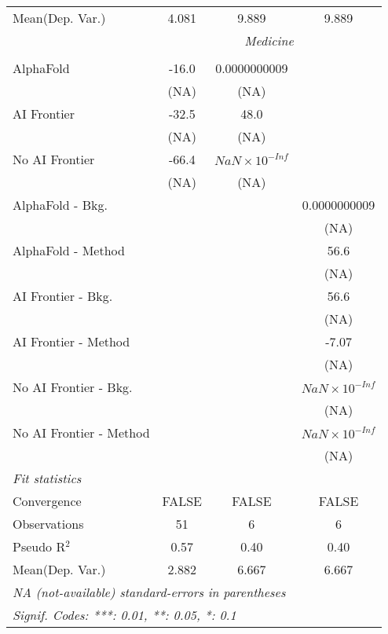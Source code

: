 \begin{tabular}{lccc}
Mean(Dep. Var.) & 4.081 & 9.889 & 9.889 \\
 & \multicolumn{3}{c}{\textit{Medicine}} \\ \\
   AlphaFold               & -16.0 & 0.0000000009           &   \\   
                           & (NA)  & (NA)                   &   \\   
   AI Frontier             & -32.5 & 48.0                   &   \\   
                           & (NA)  & (NA)                   &   \\   
   No AI Frontier          & -66.4 & $NaN\times 10^{-Inf}$  &   \\   
                           & (NA)  & (NA)                   &   \\   
   AlphaFold - Bkg.        &       &                        & 0.0000000009\\   
                           &       &                        & (NA)\\   
   AlphaFold - Method      &       &                        & 56.6\\   
                           &       &                        & (NA)\\   
   AI Frontier - Bkg.      &       &                        & 56.6\\   
                           &       &                        & (NA)\\   
   AI Frontier - Method    &       &                        & -7.07\\   
                           &       &                        & (NA)\\   
   No AI Frontier - Bkg.   &       &                        & $NaN\times 10^{-Inf}$\\    
                           &       &                        & (NA)\\   
   No AI Frontier - Method &       &                        & $NaN\times 10^{-Inf}$\\    
                           &       &                        & (NA)\\   
   \midrule
   \emph{Fit statistics}\\
   Convergence             &FALSE  & FALSE                  & FALSE\\  
   Observations            & 51    & 6                      & 6\\  
   Pseudo R$^2$            & 0.57  & 0.40                   & 0.40\\  
Mean(Dep. Var.) & 2.882 & 6.667 & 6.667 \\
   \midrule \midrule
   \multicolumn{4}{l}{\emph{NA (not-available) standard-errors in parentheses}}\\
   \multicolumn{4}{l}{\emph{Signif. Codes: ***: 0.01, **: 0.05, *: 0.1}}\\
\end{tabular}
\par\endgroup
